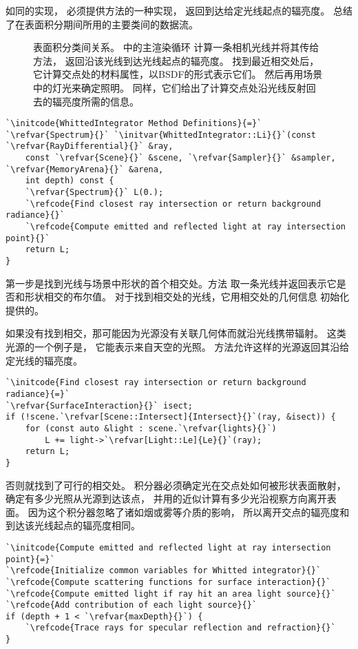 如同的实现，
必须提供方法的一种实现，
返回到达给定光线起点的辐亮度。
总结了在表面积分期间所用的主要类间的数据流。
\begin{figure}[htbp]
    \centering
    \caption{表面积分类间关系。
        \protect{}中的主渲染循环
        计算一条相机光线并将其传给方法\protect{}，
        返回沿该光线到达光线起点的辐亮度。
        找到最近相交处后，它计算交点处的材料属性，以BSDF的形式表示它们。
        然后再用场景中的灯光来确定照明。
        同样，它们给出了计算交点处沿光线反射回去的辐亮度所需的信息。}
    \label{fig:1.19}
\end{figure}
\begin{lstlisting}
`\initcode{WhittedIntegrator Method Definitions}{=}`
`\refvar{Spectrum}{}` `\initvar{WhittedIntegrator::Li}{}`(const `\refvar{RayDifferential}{}` &ray,
    const `\refvar{Scene}{}` &scene, `\refvar{Sampler}{}` &sampler, `\refvar{MemoryArena}{}` &arena,
    int depth) const {
    `\refvar{Spectrum}{}` L(0.);
    `\refcode{Find closest ray intersection or return background radiance}{}`
    `\refcode{Compute emitted and reflected light at ray intersection point}{}`
    return L;
}
\end{lstlisting}

第一步是找到光线与场景中形状的首个相交处。方法
取一条光线并返回表示它是否和形状相交的布尔值。
对于找到相交处的光线，它用相交处的几何信息
初始化提供的。

如果没有找到相交，那可能因为光源没有关联几何体而就沿光线携带辐射。
这类光源的一个例子是，
它能表示来自天空的光照。
方法允许这样的光源返回其沿给定光线的辐亮度。
\begin{lstlisting}
`\initcode{Find closest ray intersection or return background radiance}{=}`
`\refvar{SurfaceInteraction}{}` isect;
if (!scene.`\refvar[Scene::Intersect]{Intersect}{}`(ray, &isect)) {
    for (const auto &light : scene.`\refvar{lights}{}`)
        L += light->`\refvar[Light::Le]{Le}{}`(ray);
    return L;
}
\end{lstlisting}

否则就找到了可行的相交处。
积分器必须确定光在交点处如何被形状表面散射，
确定有多少光照从光源到达该点，
并用的近似计算有多少光沿视察方向离开表面。
因为这个积分器忽略了诸如烟或雾等介质的影响，
所以离开交点的辐亮度和到达该光线起点的辐亮度相同。
\begin{lstlisting}
`\initcode{Compute emitted and reflected light at ray intersection point}{=}`
`\refcode{Initialize common variables for Whitted integrator}{}`
`\refcode{Compute scattering functions for surface interaction}{}`
`\refcode{Compute emitted light if ray hit an area light source}{}`
`\refcode{Add contribution of each light source}{}`
if (depth + 1 < `\refvar{maxDepth}{}`) {
    `\refcode{Trace rays for specular reflection and refraction}{}`
}
\end{lstlisting}

